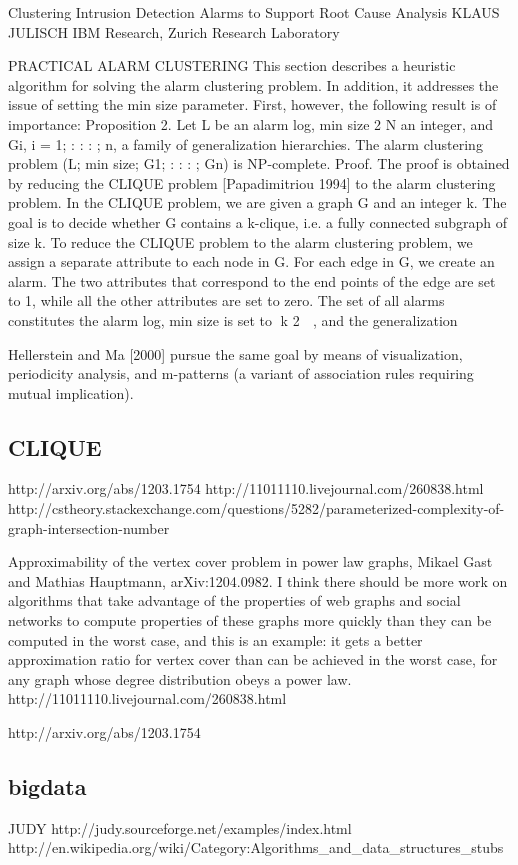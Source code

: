 \documentclass[12pt]{article}
\begin{document}
Clustering Intrusion Detection Alarms to Support
Root Cause Analysis
KLAUS JULISCH
IBM Research, Zurich Research Laboratory

PRACTICAL ALARM CLUSTERING
This section describes a heuristic algorithm for solving the alarm clustering problem.
In addition, it addresses the issue of setting the min size parameter. First, however,
the following result is of importance:
Proposition 2. Let L be an alarm log, min size 2 N an integer, and Gi, i =
1; : : : ; n, a family of generalization hierarchies. The alarm clustering problem
(L; min size; G1; : : : ; Gn) is NP-complete.
Proof. The proof is obtained by reducing the CLIQUE problem [Papadimitriou
1994] to the alarm clustering problem. In the CLIQUE problem, we are given a
graph G and an integer k. The goal is to decide whether G contains a k-clique, i.e.
a fully connected subgraph of size k. To reduce the CLIQUE problem to the alarm
clustering problem, we assign a separate attribute to each node in G. For each edge
in G, we create an alarm. The two attributes that correspond to the end points
of the edge are set to 1, while all the other attributes are set to zero. The set of
all alarms constitutes the alarm log, min size is set to
􀀀k
2

, and the generalization

Hellerstein and Ma [2000] pursue the same goal by means of
visualization, periodicity analysis, and m-patterns (a variant of association rules
requiring mutual implication).
\subsection*{CLIQUE}
http://arxiv.org/abs/1203.1754
http://11011110.livejournal.com/260838.html
http://cstheory.stackexchange.com/questions/5282/parameterized-complexity-of-graph-intersection-number

Approximability of the vertex cover problem in power law graphs, Mikael Gast and Mathias Hauptmann, arXiv:1204.0982. I think there should be more work on algorithms that take advantage of the properties of web graphs and social networks to compute properties of these graphs more quickly than they can be computed in the worst case, and this is an example: it gets a better approximation ratio for vertex cover than can be achieved in the worst case, for any graph whose degree distribution obeys a power law.
http://11011110.livejournal.com/260838.html

http://arxiv.org/abs/1203.1754
\subsection*{bigdata}
JUDY http://judy.sourceforge.net/examples/index.html
http://en.wikipedia.org/wiki/Category:Algorithms_and_data_structures_stubs
\end{document}
